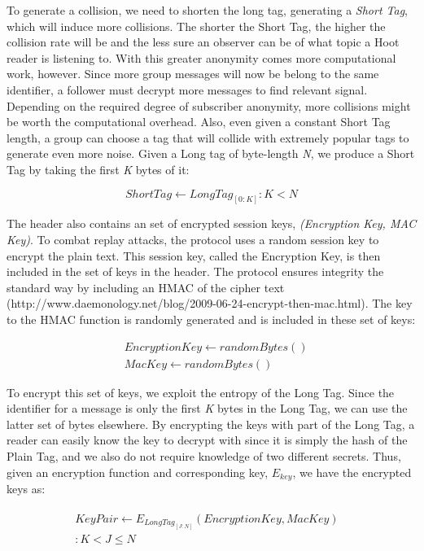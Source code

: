 To generate a collision, we need to shorten the long tag, generating a \textit{Short Tag}, which will induce more collisions. The shorter the Short Tag, the higher the collision rate will be and the less sure an observer can be of what topic a Hoot reader is listening to. With this greater anonymity comes more computational work, however. Since more group messages will now be belong to the same identifier, a follower must decrypt more messages to find relevant signal. Depending on the required degree of subscriber anonymity, more collisions might be worth the computational overhead. Also, even given a constant Short Tag length, a group can choose a tag that will collide with extremely popular tags to generate even more noise. Given a Long tag of byte-length \textit{N}, we produce a Short Tag by taking the first \textit{K} bytes of it:

\begin{equation*}
	\mathit{ShortTag} \leftarrow \mathit{LongTag}_{[0:K]} : K < N
\end{equation*}

The header also contains an set of encrypted session keys, \textit{(Encryption Key, MAC Key)}. To combat replay attacks, the protocol uses a random session key to encrypt the plain text. This session key, called the Encryption Key, is then included in the set of keys in the header. The protocol ensures integrity the standard way by including an HMAC of the cipher text (http://www.daemonology.net/blog/2009-06-24-encrypt-then-mac.html). The key to the HMAC function is randomly generated and is included in these set of keys: 

\begin{align*}
	& \mathit{EncryptionKey} \leftarrow \mathit{randomBytes}\left(\right) \\
	& \mathit{MacKey} \leftarrow \mathit{randomBytes}\left(\right)
\end{align*}

To encrypt this set of keys, we exploit the entropy of the Long Tag. Since the identifier for a message is only the first \textit{K} bytes in the Long Tag, we can use the latter set of bytes elsewhere. By encrypting the keys with part of the Long Tag, a reader can easily know the key to decrypt with since it is simply the hash of the Plain Tag, and we also do not require knowledge of two different secrets. Thus, given an encryption function and corresponding key, \textit{$E_{key}$}, we have the encrypted keys as:

\begin{align*}
\begin{split}
	\mathit{KeyPair} \leftarrow E_{\mathit{LongTag}_{[J:N]}}\left(\mathit{EncryptionKey},\mathit{MacKey}\right)& \\
	: K < J \leq N &
\end{split}	
\end{align*}

